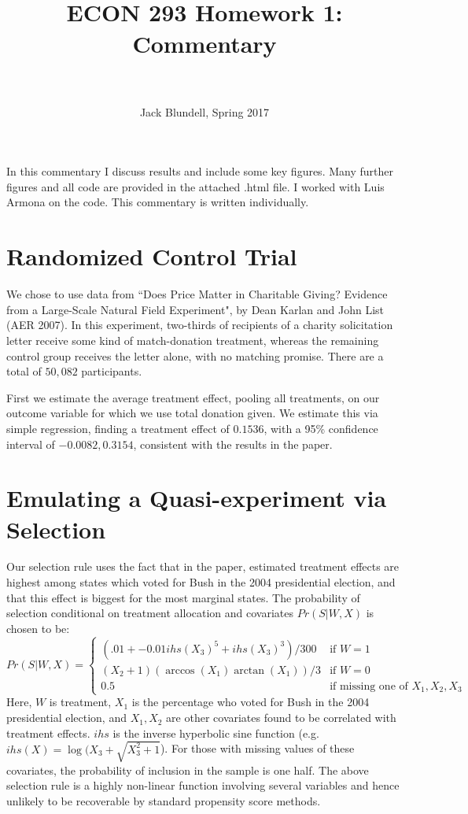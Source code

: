 \documentclass[paper=letter, fontsize=11pt]{scrartcl} %
\title{	
\normalfont \normalsize 
\horrule{0.5pt} \\[0.4cm] %
 \large{{\textbf{ECON 293 Homework 1: Commentary}}} \\ %
\horrule{2pt} \\[0.5cm] %
}
\author{\small{Jack Blundell, Spring 2017}} %
\date{} %
\begin{document}
\maketitle %

In this commentary I discuss results and include some key figures. Many further figures and all code are provided in the attached .html file. I worked with Luis Armona on the code. This commentary is written individually.

\section{Randomized Control Trial}

We chose to use data from ``Does Price Matter in Charitable Giving?
Evidence from a Large-Scale Natural Field Experiment", by Dean Karlan and John List (AER 2007). In this experiment, two-thirds of recipients of a charity solicitation letter receive some kind of match-donation treatment, whereas the remaining control group receives the letter alone, with no matching promise. There are a total of $50,082$ participants. 

First we estimate the average treatment effect, pooling all treatments, on our outcome variable for which we use total donation given. We estimate this via simple regression, finding a treatment effect of $0.1536$, with a 95\% confidence interval of $-0.0082, 0.3154 $, consistent with the results in the paper.

\section{Emulating a Quasi-experiment via Selection}

Our selection rule uses the fact that in the paper, estimated treatment effects are highest among states which voted for Bush in the 2004 presidential election, and that this effect is biggest for the most marginal states. The probability of selection conditional on treatment allocation and covariates $Pr(S|W,X)$ is chosen to be:
\[
  Pr(S|W,X)= \begin{cases}
  	  (.01 + -0.01 ihs(X_{3})^5 + ihs(X_{3})^3)/300 & \text{if $W=1$} \\
	  (X_{2}+1) (\arccos(X_{1}) \arctan(X_{1}) )/3 & \text{if $W=0$} \\ 
     0.5 & \text{if missing one of } X_{1},X_{2},X_{3}
      \end{cases} 
\]
Here, $W$ is treatment, $X_1$ is the percentage who voted for Bush in the 2004 presidential election, and $X_1,X_2$ are other covariates found to be correlated with treatment effects. $ihs$ is the inverse hyperbolic sine function (e.g. $ihs(X) = \log(X_{3} + \sqrt{X_{3} ^ 2 + 1}$). For those with missing values of these covariates, the probability of inclusion in the sample is one half. The above selection rule is a highly non-linear function involving several variables and hence unlikely to be recoverable by standard propensity score methods. 
\end{document}
